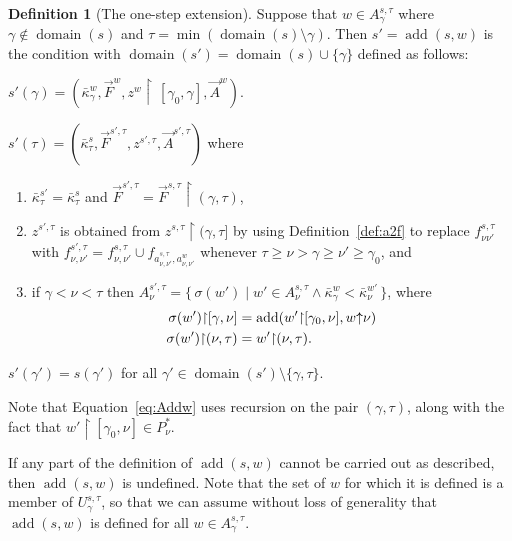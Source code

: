 \documentclass[
twoside,
]{article}
\theoremstyle{definition}
\newtheorem{definition}[theorem]{Definition}
\theoremstyle{remark}
\newcommand{\forceKappa}{\bar\kappa} %
\DeclareMathOperator{\add}{add}
\newcommand{\scutdown}{{\uparrow}}
\newcommand{\sing}[1]{\{#1\}}
\newcommand{\set}[1]{\{\,#1\,\}}
\newcommand{\restrict}{{\upharpoonright}}
\DeclareMathOperator{\domain}{domain}
\begin{document}
\begin{definition}[The one-step extension]
  \label{def:one-step}
  Suppose that $w\in A^{s,\tau}_{\gamma}$ where
  $\gamma\notin\domain(s)$ and 
  $\tau=\min(\domain(s)\setminus\gamma)$.  Then $s'=\add(s,w)$ is the
  condition with $\domain(s')=\domain(s)\cup\sing{\gamma}$ defined as
  follows:

  \begin{compactenum}
  \item
      $s'(\gamma)=(\forceKappa_\gamma^{w},\vec F^{w},
      z^{w}\restrict\,[\gamma_0,\gamma], \vec A^{w})$.

  \item
    $s'(\tau)=(\forceKappa_\tau^{s},\vec F^{s',\tau}, z^{s',\tau},
    \vec A^{s',\tau})$ where
    \begin{enumerate}
    \item $\forceKappa_\tau^{s'}=\forceKappa_\tau^{s}$ and
      $\vec F^{s',\tau{}}=\vec F^{s,\tau}\restrict(\gamma,\tau)$,
    \item $z^{s',\tau}$ is obtained from
      $z^{s,\tau}\restrict(\gamma,\tau]$ by using
      Definition~\ref{def:a2f} to replace $f^{s,\tau}_{\nu\nu'}$ with
      $f^{s',\tau}_{\nu,\nu'}=f^{s,\tau}_{\nu,\nu'}\cup f_{a^{s,\tau}_{\nu,\nu'},a^{w}_{\nu,\nu'}}$
      whenever $\tau\geq\nu>\gamma\geq\nu'\geq\gamma_0$, and
    \item\label{item:AddA} if $\gamma<\nu<\tau$ then
      $A^{s',\tau}_{\nu}=\set{\sigma(w')\mid w'\in
        A^{s,\tau}_{\nu}\land
        \forceKappa_\gamma^{w}<\forceKappa_\nu^{w'}}$, where
      \begin{align}
        \label{eq:Addw}
        \sigma(w')\restrict[\gamma,\nu]
        &=\add(w'\restrict[\gamma_0,\nu],w\scutdown\nu)\\
        \sigma(w')\restrict(\nu,\tau)&=w'\restrict(\nu,\tau).\notag
      \end{align}
    \end{enumerate}
  \item
    $s'(\gamma')=s(\gamma')$     for all
    $\gamma'\in\domain(s')\setminus\sing{\gamma,\tau}$. 
  \end{compactenum}
\end{definition}

Note that Equation~\eqref{eq:Addw} uses recursion on the pair
$(\gamma,\tau)$, along with the fact that 
$w'\restrict[\gamma_0,\nu]\in P^*_{\nu}$.

If any part of the definition of $\add(s,w)$ cannot be carried out as
described, then  $\add(s,w)$ is undefined.   Note that the set of $w$
for which it is defined is a member of $U^{s,\tau}_{\gamma}$, so that
we can assume without loss of generality that $\add(s,w)$ is defined
for all $w\in A^{s,\tau}_{\gamma}$.
\end{document}
